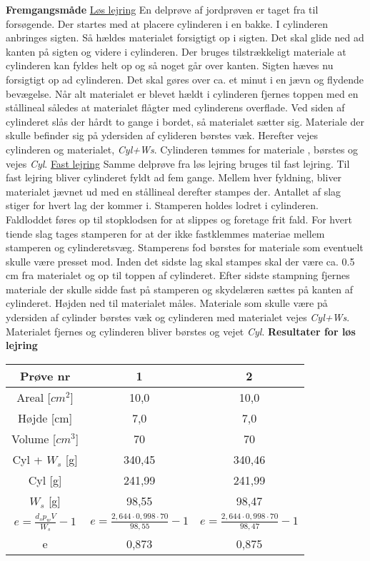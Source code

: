 \textbf{Fremgangsmåde}
\newline
\underline{Løs lejring}
\newline
En delprøve af jordprøven er taget fra til forsøgende. Der startes med at placere cylinderen i en bakke. I cylinderen anbringes sigten. Så hældes materialet forsigtigt  op i sigten. Det skal glide ned ad kanten på sigten og videre i cylinderen. Der bruges tilstrækkeligt materiale at cylinderen kan fyldes helt op og så noget går over kanten. Sigten hæves nu forsigtigt op ad cylinderen. Det skal gøres over ca. et minut  i en jævn og flydende bevægelse. Når alt materialet er blevet hældt i cylinderen fjernes toppen med en stållineal således at materialet flågter med cylinderens overflade. Ved siden af cylinderet slås der hårdt to gange i bordet, så materialet sætter sig. Materiale der skulle befinder sig på ydersiden af cylideren børstes væk. Herefter vejes cylinderen og materialet, \textit{Cyl+Ws}. Cylinderen tømmes for materiale , børstes og vejes \textit{Cyl}.
\newline
\newline
\underline{Fast lejring}
\newline
Samme delprøve fra løs lejring bruges til fast lejring. Til fast lejring bliver cylinderet fyldt ad fem gange. Mellem hver fyldning, bliver materialet jævnet ud med en stållineal derefter stampes der. Antallet af slag stiger for hvert lag der kommer i. Stamperen holdes lodret i cylinderen. Faldloddet føres op til stopklodsen for at slippes og foretage frit fald. For hvert tiende slag tages stamperen for at der ikke fastklemmes materiae mellem stamperen og cylinderetsvæg. Stamperens fod børstes for materiale som eventuelt skulle være presset mod. Inden det sidste lag skal stampes skal der være ca. 0.5 cm fra materialet og op til toppen af cylinderet. Efter sidste stampning fjernes materiale der skulle sidde fast på stamperen og skydelæren sættes på kanten af cylinderet. Højden ned til materialet måles. Materiale som skulle være på ydersiden af cylinder børstes væk og cylinderen med materialet vejes \textit{Cyl+Ws}. Materialet fjernes og cylinderen bliver børstes og vejet \textit{Cyl}.
\newline
\newline
\textbf{Resultater for løs lejring}
\begin{center}
	\begin{tabular}{ |c|c|c| } 
		\hline
		Prøve nr & 1 & 2 \\	\hline 
		Areal [$cm^2$] & 10,0 & 10,0 \\ \hline
		Højde [cm] & 7,0 & 7,0 \\ \hline
		Volume [$cm^3$] & 70 & 70 \\ \hline
		Cyl + $W_s$ [g] & 340,45 & 340,46 \\ \hline
		Cyl [g] & 241,99 & 241,99 \\ \hline
		$W_s$ [g] & 98,55 & 98,47 \\ \hline
		$e=\frac{d_sp_wV}{W_s}-1$ & $e=\frac{2,644\cdot0,998\cdot70}{98,55}-1$ & $e=\frac{2,644\cdot0,998\cdot70}{98,47}-1$  \\ \hline
		e & 0,873 & 0,875 \\ \hline
	\end{tabular}
\end{center}

